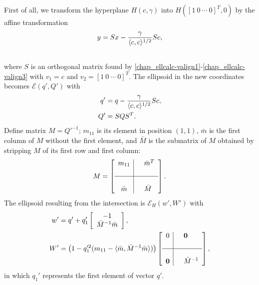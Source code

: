 \documentclass[letterpaper,10pt,english]{sphinxmanual}
\begin{document}
First of all, we transform the hyperplane $H(c,\gamma)$ into
$H([1~0~\cdots~0]^T, 0)$ by the affine transformation
\begin{gather}
\begin{split}y = Sx - \frac{\gamma}{\langle c,c\rangle^{1/2}}Sc,\end{split}\notag\\\begin{split}\end{split}\notag
\end{gather}
where $S$ is an orthogonal matrix found by \eqref{chap_ellcalc-valign1}-\eqref{chap_ellcalc-valign3}
with $v_1=c$ and $v_2=[1~0~\cdots~0]^T$. The ellipsoid in
the new coordinates becomes ${\mathcal E}(q',Q')$ with
\begin{gather}
\begin{split}\begin{aligned}
q' & = q-\frac{\gamma}{\langle c,c\rangle^{1/2}}Sc, \\
Q' & = SQS^T.\end{aligned}\end{split}\notag
\end{gather}
Define matrix $M=Q'^{-1}$; $m_{11}$ is its element in
position $(1,1)$, $\bar{m}$ is the first column of $M$
without the first element, and $\bar{M}$ is the submatrix of
$M$ obtained by stripping $M$ of its first row and first
column:
\begin{gather}
\begin{split}M = \left[\begin{array}{c|cl}
m_{11} & & \bar{m}^T\\
 & \\
\hline
 & \\
\bar{m} & & \bar{M}\end{array}\right].\end{split}\notag
\end{gather}
The ellipsoid resulting from the intersection is
${\mathcal E}_H(w',W')$ with
\begin{gather}
\begin{split}\begin{aligned}
w' & = q' + q_1'\left[\begin{array}{c}
-1\\
\bar{M}^{-1}\bar{m}\end{array}\right],\\
W' & = \left(1-q_1'^2(m_{11}-
\langle\bar{m},\bar{M}^{-1}\bar{m}\rangle)\right)\left[\begin{array}{c|cl}
0 & & {\bf 0}\\
 & \\
\hline
 & \\
{\bf 0} & & \bar{M}^{-1}\end{array}\right],\end{aligned}\end{split}\notag
\end{gather}
in which $q_1'$ represents the first element of vector $q'$.
\end{document}
